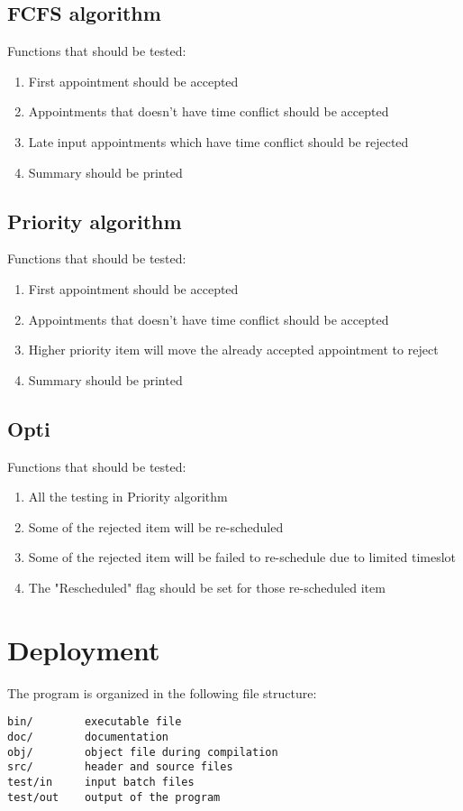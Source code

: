 \documentclass[12pt,a4paper]{report}
\begin{document}
\section{FCFS algorithm}
Functions that should be tested:
\begin{enumerate}
\item First appointment should be accepted
\item Appointments that doesn't have time conflict should be accepted
\item Late input appointments which have time conflict should be rejected
\item Summary should be printed
\end{enumerate}

\section{Priority algorithm}
Functions that should be tested:
\begin{enumerate}
\item First appointment should be accepted
\item Appointments that doesn't have time conflict should be accepted
\item Higher priority item will move the already accepted appointment to reject
\item Summary should be printed
\end{enumerate}

\section{Opti}
Functions that should be tested:
\begin{enumerate}
\item All the testing in Priority algorithm
\item Some of the rejected item will be re-scheduled
\item Some of the rejected item will be failed to re-schedule due to limited timeslot
\item The "Rescheduled" flag should be set for those re-scheduled item
\end{enumerate}


\chapter{Deployment}
The program is organized in the following file structure:
\begin{verbatim}
bin/        executable file
doc/        documentation
obj/        object file during compilation
src/        header and source files
test/in     input batch files
test/out    output of the program
\end{verbatim}
\end{document}

